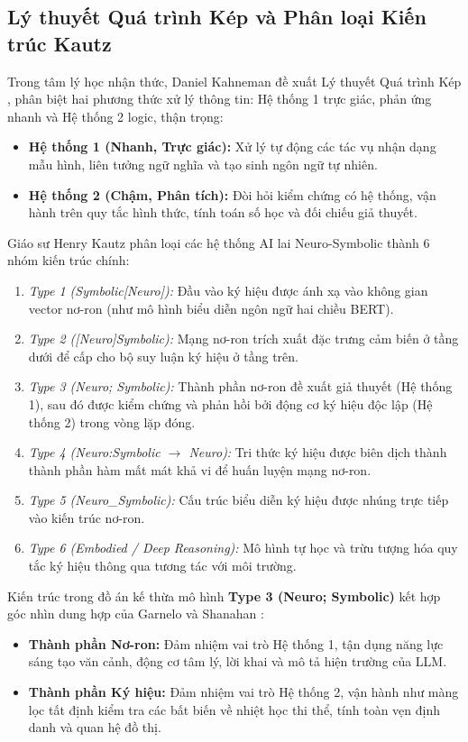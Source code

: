 \subsection{Lý thuyết Quá trình Kép và Phân loại Kiến trúc Kautz}
Trong tâm lý học nhận thức, Daniel Kahneman đề xuất Lý thuyết Quá trình Kép \cite{kahneman2011thinking}, phân biệt hai phương thức xử lý thông tin: Hệ thống 1 trực giác, phản ứng nhanh và Hệ thống 2 logic, thận trọng:
\begin{itemize}[leftmargin=1.5cm]
    \item \textbf{Hệ thống 1 (Nhanh, Trực giác):} Xử lý tự động các tác vụ nhận dạng mẫu hình, liên tưởng ngữ nghĩa và tạo sinh ngôn ngữ tự nhiên.
    \item \textbf{Hệ thống 2 (Chậm, Phân tích):} Đòi hỏi kiểm chứng có hệ thống, vận hành trên quy tắc hình thức, tính toán số học và đối chiếu giả thuyết.
\end{itemize}

Giáo sư Henry Kautz \cite{kautz2022third} phân loại các hệ thống AI lai Neuro-Symbolic thành 6 nhóm kiến trúc chính:
\begin{enumerate}[leftmargin=1.5cm]
    \item \textit{Type 1 (Symbolic[Neuro]):} Đầu vào ký hiệu được ánh xạ vào không gian vector nơ-ron (như mô hình biểu diễn ngôn ngữ hai chiều BERT).
    \item \textit{Type 2 ([Neuro]Symbolic):} Mạng nơ-ron trích xuất đặc trưng cảm biến ở tầng dưới để cấp cho bộ suy luận ký hiệu ở tầng trên.
    \item \textit{Type 3 (Neuro; Symbolic):} Thành phần nơ-ron đề xuất giả thuyết (Hệ thống 1), sau đó được kiểm chứng và phản hồi bởi động cơ ký hiệu độc lập (Hệ thống 2) trong vòng lặp đóng.
    \item \textit{Type 4 (Neuro:Symbolic $\to$ Neuro):} Tri thức ký hiệu được biên dịch thành thành phần hàm mất mát khả vi để huấn luyện mạng nơ-ron.
    \item \textit{Type 5 (Neuro\_Symbolic):} Cấu trúc biểu diễn ký hiệu được nhúng trực tiếp vào kiến trúc nơ-ron.
    \item \textit{Type 6 (Embodied / Deep Reasoning):} Mô hình tự học và trừu tượng hóa quy tắc ký hiệu thông qua tương tác với môi trường.
\end{enumerate}

Kiến trúc trong đồ án kế thừa mô hình \textbf{Type 3 (Neuro; Symbolic)} kết hợp góc nhìn dung hợp của Garnelo và Shanahan \cite{garnelo2019reconciling}:
\begin{itemize}[leftmargin=1.5cm]
    \item \textbf{Thành phần Nơ-ron:} Đảm nhiệm vai trò Hệ thống 1, tận dụng năng lực sáng tạo văn cảnh, động cơ tâm lý, lời khai và mô tả hiện trường của LLM.
    \item \textbf{Thành phần Ký hiệu:} Đảm nhiệm vai trò Hệ thống 2, vận hành như màng lọc tất định kiểm tra các bất biến về nhiệt học thi thể, tính toàn vẹn định danh và quan hệ đồ thị.
\end{itemize}

